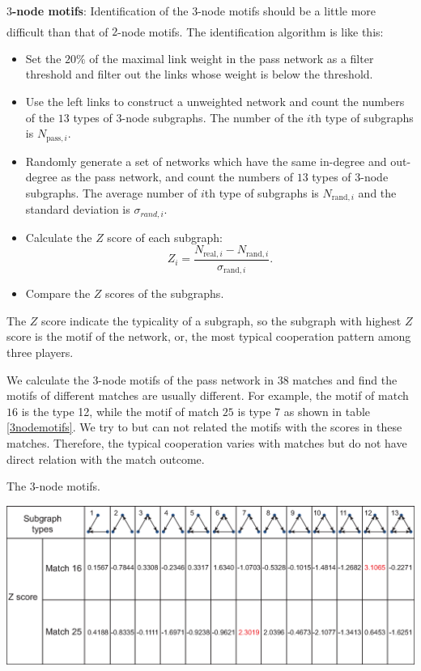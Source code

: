 \documentclass[12pt]{article}
\newcommand{\upcite}[1]{\textsuperscript{\textsuperscript{\cite{#1}}}}
\begin{document}
\textbf{$3$-node motifs}: Identification of the $3$-node motifs should be a little more difficult than that of $2$-node motifs. The identification algorithm is like this\upcite{gursakal2018network}:
\begin{itemize}
	\item Set the $20\%$ of the maximal link weight in the pass network as a filter threshold and filter out the links whose weight is below the threshold.
	\item Use the left links to construct a unweighted network and count the numbers of the $13$ types of $3$-node subgraphs. The number of the $i$th type of subgraphs is $N_{\text{pass},i}$.
	\item Randomly generate a set of networks which have the same in-degree and out-degree as the pass network, and count the numbers of $13$ types of $3$-node subgraphs. The average number of $i$th type of subgraphs is $N_{\text{rand},i}$ and the standard deviation is $\sigma_{rand,i}$.
	\item Calculate the $Z$ score of each subgraph:
	\begin{equation}
		Z_i=\frac{N_{\text{real},i}-N_{\text{rand},i}}{\sigma_{\text{rand},i}}.
	\end{equation}
	\item Compare the $Z$ scores of the subgraphs.
\end{itemize}
The $Z$ score indicate the typicality of a subgraph, so the subgraph with highest $Z$ score is the motif of the network, or, the most typical cooperation pattern among three players.

We calculate the $3$-node motifs of the pass network in $38$ matches and find the motifs of different matches are usually different. For example, the motif of match $16$ is the type 12, while the motif of match $25$ is type 7 as shown in table \ref{3nodemotifs}. We try to but can not related the motifs with the scores in these matches. Therefore, the typical cooperation varies with matches but do not have direct relation with the match outcome.
\begin{table}[h]
	\centering
	\caption{The $3$-node motifs.}
	\label{3nodemotifs}
	\includegraphics[width=1\textwidth]{3NodeMotifs.eps}
\end{table}
\end{document}
